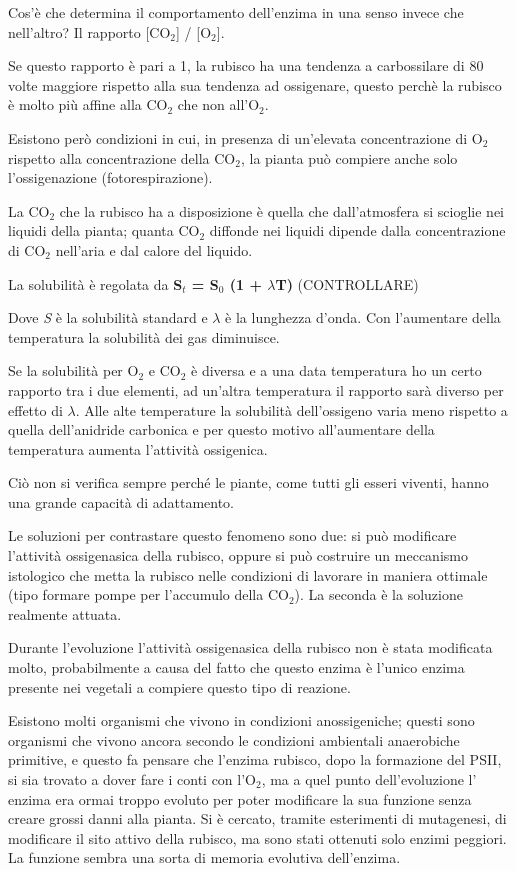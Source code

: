 \documentclass[]{article}
\begin{document}
Cos'è che determina il comportamento dell'enzima in una senso invece che
nell'altro? Il rapporto {[}CO$_2${]} / {[}O$_2${]}.

Se questo rapporto è pari a 1, la rubisco ha una tendenza a carbossilare
di 80 volte maggiore rispetto alla sua tendenza ad ossigenare, questo
perchè la rubisco è molto più affine alla CO$_2$ che non all'O$_2$.

Esistono però condizioni in cui, in presenza di un'elevata
concentrazione di O$_2$ rispetto alla concentrazione della CO$_2$, la
pianta può compiere anche solo l'ossigenazione (fotorespirazione).

La CO$_2$ che la rubisco ha a disposizione è quella che dall'atmosfera
si scioglie nei liquidi della pianta; quanta CO$_2$ diffonde nei liquidi
dipende dalla concentrazione di CO$_2$ nell'aria e dal calore del
liquido.

La solubilità è regolata da \textbf{S$_t$ = S$_0$ (1 + $\lambda$T)}
(CONTROLLARE)

Dove \emph{S} è la solubilità standard e \emph{$\lambda$} è la lunghezza
d'onda. Con l'aumentare della temperatura la solubilità dei gas
diminuisce.

Se la solubilità per O$_2$ e CO$_2$ è diversa e a una data temperatura
ho un certo rapporto tra i due elementi, ad un'altra temperatura il
rapporto sarà diverso per effetto di $\lambda$. Alle alte temperature la
solubilità dell'ossigeno varia meno rispetto a quella dell'anidride
carbonica e per questo motivo all'aumentare della temperatura aumenta
l'attività ossigenica.

Ciò non si verifica sempre perché le piante, come tutti gli esseri
viventi, hanno una grande capacità di adattamento.

Le soluzioni per contrastare questo fenomeno sono due: si può modificare
l'attività ossigenasica della rubisco, oppure si può costruire un
meccanismo istologico che metta la rubisco nelle condizioni di lavorare
in maniera ottimale (tipo formare pompe per l'accumulo della CO$_2$). La
seconda è la soluzione realmente attuata.

Durante l'evoluzione l'attività ossigenasica della rubisco non è stata
modificata molto, probabilmente a causa del fatto che questo enzima è
l'unico enzima presente nei vegetali a compiere questo tipo di reazione.

Esistono molti organismi che vivono in condizioni anossigeniche; questi
sono organismi che vivono ancora secondo le condizioni ambientali
anaerobiche primitive, e questo fa pensare che l'enzima rubisco, dopo la
formazione del PSII, si sia trovato a dover fare i conti con l'O$_2$, ma
a quel punto dell'evoluzione l' enzima era ormai troppo evoluto per
poter modificare la sua funzione senza creare grossi danni alla pianta.
Si è cercato, tramite esterimenti di mutagenesi, di modificare il sito
attivo della rubisco, ma sono stati ottenuti solo enzimi peggiori. La
funzione sembra una sorta di memoria evolutiva dell'enzima.
\end{document}
